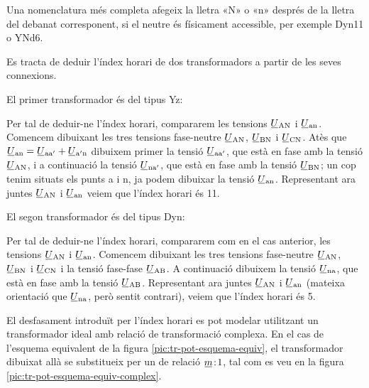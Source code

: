Una nomenclatura més completa afegeix la lletra «N» o «n» després de la lletra del debanat corresponent, si el neutre és físicament accessible, per exemple Dyn11 o YNd6.

	
\begin{exemple}[\IndexHorari{}]
	\addcontentsxms{\IndexHorari}
    Es tracta de deduir l'índex horari de dos transformadors a partir de les seves connexions.


    El primer transformador és del tipus Yz:
     \vspace{-2mm}
    \begin{center}
        
    \end{center}
     Per tal de deduir-ne l'índex horari, compararem les tensions
    $\cmplx{U}\ped{AN}$ i $\cmplx{U}\ped{an}$. Comencem dibuixant les tres tensions fase-neutre $\cmplx{U}\ped{AN}$, $\cmplx{U}\ped{BN}$ i $\cmplx{U}\ped{CN}$. Atès que $\cmplx{U}\ped{an} = \cmplx{U}\ped{aa'} + \cmplx{U}\ped{a'n}$ dibuixem primer la tensió $\cmplx{U}\ped{aa'}$, que està en fase amb la tensió $\cmplx{U}\ped{AN}$, i a continuació la tensió $\cmplx{U}\ped{na'}$, que està en fase amb la tensió $\cmplx{U}\ped{BN}$; un cop tenim situats els punts a i n, ja podem dibuixar la tensió $\cmplx{U}\ped{an}$. Representant ara juntes $\cmplx{U}\ped{AN}$ i $\cmplx{U}\ped{an}$  veiem que l'índex horari és 11.


     El segon transformador és del tipus Dyn:
      \vspace{-2mm}
    \begin{center}
       
    \end{center}
      Per tal de deduir-ne l'índex horari, compararem com en el cas anterior, les tensions $\cmplx{U}\ped{AN}$ i $\cmplx{U}\ped{an}$. Comencem dibuixant les tres tensions fase-neutre $\cmplx{U}\ped{AN}$, $\cmplx{U}\ped{BN}$ i $\cmplx{U}\ped{CN}$ i la tensió fase-fase $\cmplx{U}\ped{AB}$.  A continuació dibuixem la tensió $\cmplx{U}\ped{na}$, que està en fase amb la tensió $\cmplx{U}\ped{AB}$. Representant ara juntes $\cmplx{U}\ped{AN}$ i $\cmplx{U}\ped{an}$ (mateixa orientació que $\cmplx{U}\ped{na}$, però sentit contrari),  veiem que l'índex horari és 5.
\end{exemple}

El desfasament introduït per l'índex horari es pot modelar utilitzant  un transformador ideal amb relació de transformació complexa. En el cas de l'esquema equivalent de la figura  \vref{pic:tr-pot-esquema-equiv}, el transformador  dibuixat allà
se substitueix per un de relació $\cmplx{m}\!:\!1$, tal com es veu en la figura \vref{pic:tr-pot-esquema-equiv-complex}.

